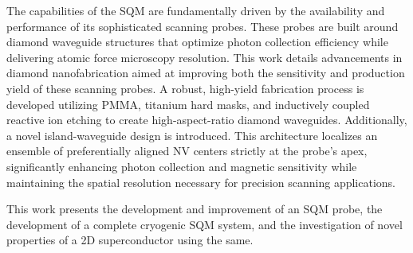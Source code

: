 The capabilities of the SQM are fundamentally driven by the availability and performance of its sophisticated scanning probes. These probes are built around diamond waveguide structures that optimize photon collection efficiency while delivering atomic force microscopy resolution. This work details advancements in diamond nanofabrication aimed at improving both the sensitivity and production yield of these scanning probes. A robust, high-yield fabrication process is developed utilizing PMMA, titanium hard masks, and inductively coupled reactive ion etching to create high-aspect-ratio diamond waveguides. Additionally, a novel island-waveguide design is introduced. This architecture localizes an ensemble of preferentially aligned NV centers strictly at the probe's apex, significantly enhancing photon collection and magnetic sensitivity while maintaining the spatial resolution necessary for precision scanning applications.

This work presents the development and improvement of an SQM probe, the development of a complete cryogenic SQM system, and the investigation of novel properties of a 2D superconductor using the same.